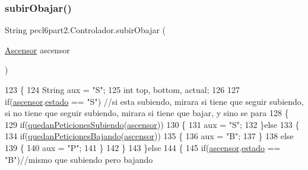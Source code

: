 \subsubsection{\texorpdfstring{subir\+Obajar()}{subirObajar()}}
{\footnotesize\ttfamily String pecl6part2.\+Controlador.\+subir\+Obajar (\begin{DoxyParamCaption}\item[{\mbox{\hyperlink{classpecl6part2_1_1_ascensor}{Ascensor}}}]{ascensor }\end{DoxyParamCaption})\hspace{0.3cm}{\ttfamily [inline]}}


\begin{DoxyCode}
123     \{
124         String aux = \textcolor{stringliteral}{"S"};
125         \textcolor{keywordtype}{int} top, bottom, actual;
126         
127         \textcolor{keywordflow}{if}(\mbox{\hyperlink{classpecl6part2_1_1_controlador_ac2f7c4abd5447ea5daeeb7d62bf3f591}{ascensor}}.\mbox{\hyperlink{classpecl6part2_1_1_ascensor_a6a578a2c1bc59586257fe412a44354ac}{estado}} == \textcolor{stringliteral}{"S"})      \textcolor{comment}{//si esta subiendo, mirara si tiene que seguir
       subiendo, si no tiene que seguir subiendo, mirara si tiene que bajar, y sino se para}
128         \{
129             \textcolor{keywordflow}{if}(\mbox{\hyperlink{classpecl6part2_1_1_controlador_a759775f24cc82dc8b5ef275e42a12e3a}{quedanPeticionesSubiendo}}(\mbox{\hyperlink{classpecl6part2_1_1_controlador_ac2f7c4abd5447ea5daeeb7d62bf3f591}{ascensor}}))
130             \{
131                 aux = \textcolor{stringliteral}{"S"};
132             \}\textcolor{keywordflow}{else}
133             \{
134                 \textcolor{keywordflow}{if}(\mbox{\hyperlink{classpecl6part2_1_1_controlador_a18f3f9c74dda296867c72588a840880c}{quedanPeticionesBajando}}(\mbox{\hyperlink{classpecl6part2_1_1_controlador_ac2f7c4abd5447ea5daeeb7d62bf3f591}{ascensor}}))
135                 \{
136                     aux = \textcolor{stringliteral}{"B"};
137                 \}
138                 \textcolor{keywordflow}{else}
139                 \{
140                     aux = \textcolor{stringliteral}{"P"};
141                 \}
142             \}
143         \}\textcolor{keywordflow}{else}
144         \{
145             \textcolor{keywordflow}{if}(\mbox{\hyperlink{classpecl6part2_1_1_controlador_ac2f7c4abd5447ea5daeeb7d62bf3f591}{ascensor}}.\mbox{\hyperlink{classpecl6part2_1_1_ascensor_a6a578a2c1bc59586257fe412a44354ac}{estado}} == \textcolor{stringliteral}{"B"})\textcolor{comment}{//mismo que subiendo pero bajando}

\end{DoxyCode}
